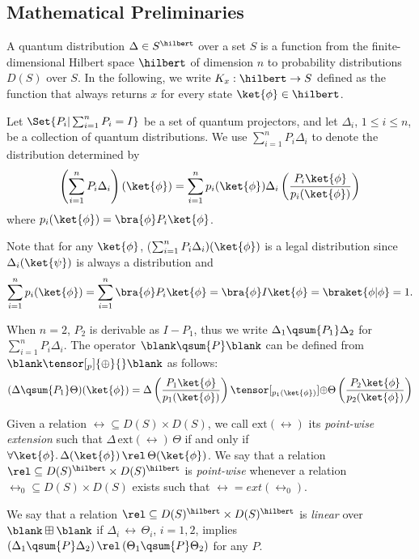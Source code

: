 \subsection{Mathematical Preliminaries}

A quantum distribution $\Delta \in S^\hilbert$ over a set $S$ is a function from the finite-dimensional Hilbert space $\hilbert$ of dimension $n$ to probability distributions $D(S)$ over $S$.
In the following, we write $K_{x} : \hilbert \to S$ defined as the function that always returns $x$ for every state $\ket{\phi} \in \hilbert$.

Let $\Set{P_i | \sum_{i = 1}^{n} P_i = I }$ be a set of quantum projectors, and let $\Delta_i$, $1 \leq i \leq n$, be a collection of quantum distributions.
We use $\sum_{i = 1}^{n} P_i \Delta_i$ to denote the distribution determined by 
\[
\left(\sum_{i = 1}^{n} P_i \Delta_i\right) (\ket{\phi}) = \sum_{i = 1}^{n} p_i(\ket{\phi}) \Delta_i \left(\frac{P_i \ket{\phi}}{p_i(\ket{\phi})}\right)
\]
where $p_i(\ket{\phi}) = \bra{\phi} P_i \ket{\phi}$.

Note that for any $\ket{\phi}$, ($\sum_{i = 1}^{n} P_i \Delta_i) (\ket{\phi})$ is a legal distribution since $\Delta_i(\ket{\psi})$ is always a distribution and
\[
\sum_{i = 1}^{n} p_i (\ket{\phi}) = \sum_{i = 1}^{n} \bra{\phi} P_i \ket{\phi} = \bra{\phi} I \ket{\phi} = \braket{\phi | \phi} = 1.
\]

When $n = 2$, $P_2$ is derivable as $I - P_1$, thus we write $\Delta_1 \qsum{P_1} \Delta_2$ for $\sum_{i = 1}^{n} P_i \Delta_i$.
The operator $\blank \qsum{P} \blank$ can be defined from $\blank \tensor[_p]{\oplus}{} \blank$ as follows:
\[
  (\Delta \qsum{P_1} \Theta) (\ket{\phi}) = \Delta \left(\frac{P_1 \ket{\phi}}{p_1(\ket{\phi})}\right) \tensor[_{p_1(\ket{\phi})}]{\oplus}{} \Theta \left(\frac{P_2 \ket{\phi}}{p_2(\ket{\phi})}\right)
\]

Given a relation $\rel \subseteq D(S) \times D(S)$, we call $\text{ext}(\rel)$ its \emph{point-wise extension} such that $\Delta\,\text{ext}(\rel)\,\Theta$ if and only if $\forall \ket{\phi}\ldotp \Delta(\ket{\phi})\,\rel\,\Theta(\ket{\phi})$.
We say that a relation $\rel \subseteq D(S)^\hilbert \times D(S)^\hilbert$ is \emph{point-wise} whenever a relation $\rel_0 \subseteq D(S) \times D(S)$ exists such that $\rel = ext(\rel_0)$.  

We say that a relation $\rel \subseteq D(S)^\hilbert \times D(S)^\hilbert$ is \emph{linear} over $\blank \boxplus \blank$ if $\Delta_i\,\rel\,\Theta_i$, $i = 1,2$, implies $(\Delta_1 \qsum{P} \Delta_2)\,\rel\,(\Theta_1 \qsum{P} \Theta_2)$ for any $P$.

